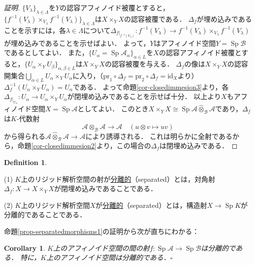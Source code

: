 \documentclass[a4paper,12pt, dvipdfmx]{jsbook}
\def\Sp{\mathop{\mathrm{Sp}}\nolimits}
\def\id{\mathrm{id}}
\theoremstyle{plain}
\newtheorem{cor}[thm]{\bfseries Corollary}
\theoremstyle{definition}
\newtheorem{dfn}[thm]{\bfseries Definition}
\begin{document}
\begin{proof}[証明]
$\{V_{\lambda}\}_{\lambda\in\Lambda}$を$Y$の認容アフィノイド被覆とすると，$\{f^{-1}(V_{\lambda})\times_{V_{\lambda}}f^{-1}(V_{\lambda})\}_{\lambda\in\Lambda}$は$X\times_YX$の認容被覆である．
$\Delta_f$が埋め込みであることを示すには，各$\lambda\in\Lambda$について$\Delta_{f|_{f^{-1}(V_{\lambda})}}\colon f^{-1}(V_{\lambda})\rightarrow f^{-1}(V_{\lambda})\times_{V_{\lambda}}f^{-1}(V_{\lambda})$が埋め込みであることを示せばよい．
よって，$Y$はアフィノイド空間$Y=\Sp\mathcal{B}$であるとしてよい．
また，$\{U_{\alpha}=\Sp\mathcal{A}_{\alpha}\}_{\alpha\in L}$を$X$の認容アフィノイド被覆とすると，$\{U_{\alpha}\times_YU_{\beta}\}_{\alpha,\beta\in L}$は$X\times_YX$の認容被覆を与える．
$\Delta_f$の像は$X\times_YX$の認容開集合$\bigcup_{\alpha\in L}U_{\alpha}\times_YU_{\alpha}$に入り，（$\mathrm{pr}_1\circ\Delta_f=\mathrm{pr}_2\circ\Delta_f=\id_X$より）$\Delta^{-1}_f(U_{\alpha}\times_YU_{\alpha})=U_{\alpha}$である．
よって命題\ref{cor-closedimmesion3}より，各$\Delta_{f|_{U_{\alpha}}}\colon U_{\alpha}\rightarrow U_{\alpha}\times_YU_{\alpha}$が閉埋め込みであることを示せば十分．
以上より$X$もアフィノイド空間$X=\Sp\mathcal{A}$としてよい．
このとき$X\times_YX\cong\Sp\mathcal{A}\widehat{\otimes}_{\mathcal{B}}\mathcal{A}$であり，$\Delta_f$は$K$-代数射
$$
\mathcal{A}\otimes_{\mathcal{B}}\mathcal{A}\longrightarrow\mathcal{A}\quad(u\otimes v\longmapsto uv)
$$
から得られる$\mathcal{A}\widehat{\otimes}_{\mathcal{B}}\mathcal{A}\rightarrow\mathcal{A}$により誘導される．
これは明らかに全射であるから，命題\ref{cor-closedimmesion2}より，この場合の$\Delta_f$は閉埋め込みである．
\end{proof}

\begin{dfn}\label{dfn-separatedmorphisms}{\rm 
(1) $K$上のリジッド解析空間の射が\underline{分離的}（separated）とは，対角射$\Delta_f\colon X\rightarrow X\times_YX$が閉埋め込みであることである．

(2) $K$上のリジッド解析空間$X$が\underline{分離的}（separated）とは，構造射$X\rightarrow\Sp K$が分離的であることである．}
\end{dfn}

命題\ref{prop-separatedmorphisms1}の証明から次が直ちにわかる：
\begin{cor}\label{cor-separatedmorphism1}{\rm 
$K$上のアフィノイド空間の間の射$f\colon\Sp\mathcal{A}\rightarrow\Sp\mathcal{B}$は分離的である．
特に，$K$上のアフィノイド空間は分離的である．}\hfill$\square$
\end{cor}
\end{document}
